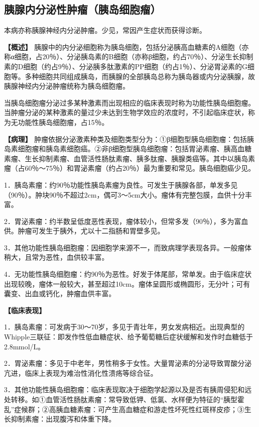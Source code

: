 \subsection{胰腺内分泌性肿瘤（胰岛细胞瘤）}

本病亦称胰腺神经内分泌肿瘤。少见，常因产生症状而获得诊断。

\textbf{【概述】}
胰腺中的内分泌细胞称为胰岛细胞，包括分泌胰高血糖素的A细胞（亦称α细胞，占20％）、分泌胰岛素的B细胞（亦称β细胞，约占70％）、分泌生长抑制素的D细胞（约占9％）、分泌胰多肽激素的PP细胞（约占1％）、分泌胃泌素的G细胞等。多种细胞共同组成胰岛，而胰腺的全部胰岛总称为胰岛器或内分泌胰腺，故胰腺神经内分泌肿瘤统称为胰岛细胞瘤。

当胰岛细胞瘤分泌过多某种激素而出现相应的临床表现时称为功能性胰岛细胞瘤。当肿瘤分泌的某种激素的量过少未达到生物学效应的浓度时，不引起临床症状，称为无功能性胰岛细胞瘤，占15％。

\textbf{【病理】}
肿瘤依据分泌激素种类及细胞类型分为：①β细胞型胰岛细胞瘤：包括胰岛素细胞瘤和胰岛素细胞癌。②非β细胞型胰岛细胞瘤：包括胃泌素瘤、胰高血糖素瘤、生长抑制素瘤、血管活性肠肽素瘤、胰多肽瘤、胰腺类癌等。其中以胰岛素瘤（占60％～75％）和胃泌素瘤（约占20％）最为重要和常见。胰岛细胞癌少见。

1．胰岛素瘤：约90％功能性胰岛素瘤为良性。可发生于胰腺各部，单发多见（90％）。肿块90％不超过2cm，偶可3～5cm大小。瘤体有完整包膜，血供十分丰富。

2．胃泌素瘤：约半数呈低度恶性表现，瘤体较小，但常多发（90％），多为富血供。肿瘤可发生于胰外，尤以十二指肠和胃壁多见。

3．其他功能性胰岛细胞瘤：因细胞学来源不一，而致病理学表现各异。一般瘤体稍大，且常为恶性，血供较丰富。

4．无功能性胰岛细胞瘤：约90％为恶性。好发于体尾部，常单发。由于临床症状出现较晚，瘤体一般较大，甚至超过10cm。瘤体呈圆形或椭圆形，无分叶；可有囊变、出血或钙化，肿瘤血供丰富。

\textbf{【临床表现】}

1．胰岛素瘤：可发病于30～70岁，多见于青壮年，男女发病相近。出现典型的Whipple三联征：即发作性低血糖症状、给予葡萄糖后症状缓解和发作时血糖低于2.8mmol/L。

2．胃泌素瘤：多见于中老年，男性稍多于女性。大量胃泌素的分泌导致胃酸分泌亢进，临床上表现为难治性消化性溃疡等综合征。

3．其他功能性胰岛细胞瘤：临床表现取决于细胞学起源以及是否有胰周侵犯和远处转移。如①血管活性肠肽素瘤：常导致低钾、低氯、水样便为特征的“胰型霍乱”症候群；②高胰血糖素瘤：可产生高血糖症和游走性坏死性红斑样皮疹；③生长抑制素瘤：出现腹泻和体重下降。

